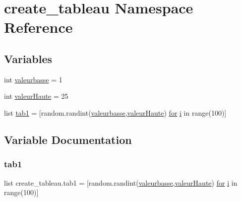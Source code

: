 \hypertarget{namespacecreate__tableau}{}\section{create\+\_\+tableau Namespace Reference}
\label{namespacecreate__tableau}
\subsection*{Variables}
\begin{DoxyCompactItemize}
\item 
int \hyperlink{namespacecreate__tableau_a8885cf10e329c7358fe8de44d41f6e93}{valeurbasse} = 1
\item 
int \hyperlink{namespacecreate__tableau_a2211d4c2d1c627b0c7d57937b9215dc5}{valeur\+Haute} = 25
\item 
list \hyperlink{namespacecreate__tableau_a4e15ae15713b7844a49641547a657038}{tab1} = \mbox{[}random.\+randint(\hyperlink{namespacecreate__tableau_a8885cf10e329c7358fe8de44d41f6e93}{valeurbasse},\hyperlink{namespacecreate__tableau_a2211d4c2d1c627b0c7d57937b9215dc5}{valeur\+Haute}) \hyperlink{exo21_8cpp_a21d2815da7c583ec46e9b81638877e7b}{for} \hyperlink{exo21_8cpp_acb559820d9ca11295b4500f179ef6392}{i} in range(100)\mbox{]}
\end{DoxyCompactItemize}


\subsection{Variable Documentation}
\mbox{\label{namespacecreate__tableau_a4e15ae15713b7844a49641547a657038}} 
\subsubsection{\texorpdfstring{tab1}{tab1}}
{\footnotesize\ttfamily list create\+\_\+tableau.\+tab1 = \mbox{[}random.\+randint(\hyperlink{namespacecreate__tableau_a8885cf10e329c7358fe8de44d41f6e93}{valeurbasse},\hyperlink{namespacecreate__tableau_a2211d4c2d1c627b0c7d57937b9215dc5}{valeur\+Haute}) \hyperlink{exo21_8cpp_a21d2815da7c583ec46e9b81638877e7b}{for} \hyperlink{exo21_8cpp_acb559820d9ca11295b4500f179ef6392}{i} in range(100)\mbox{]}}

\mbox{\label{namespacecreate__tableau_a8885cf10e329c7358fe8de44d41f6e93}} 
